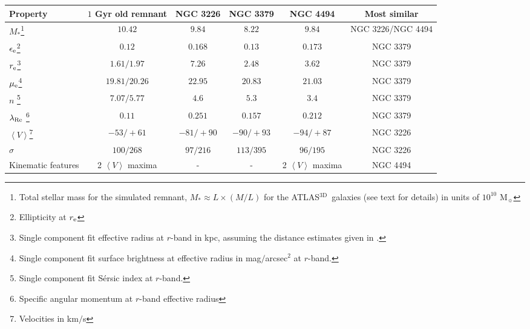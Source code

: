 \documentclass[a4paper,fleqn,usenatbib]{mnras}
\newcommand{\atlas}{\textsc{ATLAS$^\mathrm{3D}$}}
\begin{document}
\begin{table*}
 \caption{Observed properties of the best look-alikes of the Antennae merger remnant 
 in the \atlas\ sample. Properties derived from the mock-images are provided both with and without the resampling of the young stars.}
 \label{tab:atlas_lookalikes}
 \begin{minipage}{26cm}
 \begin{tabular}{l cccc c}
  \hline
  Property & $1$ Gyr old remnant & NGC 3226 & NGC 3379 & NGC 4494 & Most similar\\ [2pt]
  \hline
  
  $M_*$\footnote{Total stellar mass for the simulated remnant, $M_*\approx L\times (M/L)$ for the \atlas\ galaxies (see text for details) in units of $10^{10}$ M$_{\sun}$} 
  & $10.42$ & $9.84$ & $8.22$ &  $9.84$ & NGC 3226/NGC 4494 \\[2pt]
  
  $\epsilon_{\rm{e}}$\footnote{Ellipticity at $r_{\rm{e}}$}
  & $0.12$ &  $0.168$ & $0.13$ & $0.173$ & NGC 3379 \\[2pt]
  
  $r_{\rm{e}}$\footnote{Single component fit effective radius at $r$-band in kpc, assuming the distance estimates given in \citet{2011MNRAS.413..813C}.}
  & $1.61/1.97$ & $7.26$ & $2.48$ & $3.62$ & NGC 3379 \\ [2pt]
  
  $\mu_{\rm{e}}$\footnote{Single component fit surface brightness at effective radius in mag$/$arcsec$^2$ at $r$-band.}
  & $19.81/20.26$ & $22.95$ & $20.83$ & $21.03$ & NGC 3379 \\ [2pt]
  
  $n$ \footnote{Single component fit S\'{e}rsic index at $r$-band.}
  & $7.07/5.77$ & $4.6$ & $5.3$ & $3.4$ & NGC 3379 \\ [2pt]
  \hline
  
  $\lambda_{\rm{Re}}$ \footnote{Specific angular momentum at $r$-band effective radius}
  & $0.11$ & $0.251$ & $0.157$ & $0.212$ & NGC 3379 \\ [2pt]
  
  $\left\langle V\right\rangle$\footnote{Velocities in km$/$s} 
  & $-53/+61$ & $-81/+90$ & $-90/+93$ &  $-94/+87$ & NGC 3226 \\[2pt]
  
  $\sigma$ & $100/268$ & $97/216$ & $113/395$ &  $96/195$ & NGC 3226 \\[2pt]
  
  Kinematic features 
  & 2 $\left\langle V\right\rangle$ maxima & - & - &  2 $\left\langle V\right\rangle$ maxima & NGC 4494 \\[2pt]
  
  \hline
 \end{tabular}
 \end{minipage}
\end{table*}
\end{document}
